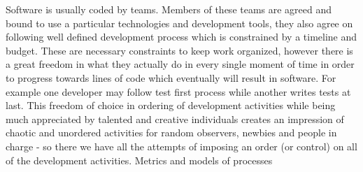 Software is usually coded by teams. Members of these teams are agreed and bound to use 
a particular technologies and development tools, they also agree on following well defined 
development process which is constrained by a timeline and budget. These are necessary 
constraints to keep work organized, however there is a great freedom in what they actually 
do in every single moment of time in order to progress towards lines of code which eventually 
will result in software. For example one developer may follow test first process while
another writes tests at last.  This freedom of choice in ordering of development activities 
while being much appreciated by talented and creative individuals creates an impression 
of chaotic and unordered activities for random observers, newbies and people in 
charge - so there we have all the attempts of imposing an order 
(or control) on all of the development activities. Metrics and models of processes




